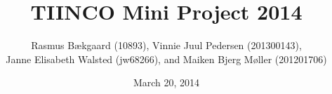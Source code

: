 \documentclass[10pt, oneside]{article}
\title{TIINCO Mini Project 2014}
\author{Rasmus Bækgaard (10893), 
Vinnie Juul Pedersen (201300143),\\ 
Janne Elisabeth Walsted (jw68266), and 
Maiken Bjerg Møller (201201706)}
\date{March 20, 2014}
\begin{document}
\maketitle

\listoffixmes








\end{document}
